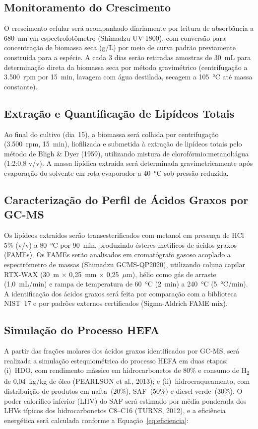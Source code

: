 \subsection{Monitoramento do Crescimento}

O crescimento celular será acompanhado diariamente por leitura de
absorbância a 680~nm em espectrofotômetro (Shimadzu UV-1800), com
conversão para concentração de biomassa seca (g/L) por meio de curva
padrão previamente construída para a espécie. A cada 3 dias serão
retiradas amostras de 30~mL para determinação direta da biomassa seca
por método gravimétrico (centrifugação a 3.500~rpm por 15~min, lavagem
com água destilada, secagem a 105~°C até massa constante).

\subsection{Extração e Quantificação de Lipídeos Totais}

Ao final do cultivo (dia~15), a biomassa será colhida por centrifugação
(3.500~rpm, 15~min), liofilizada e submetida à extração de lipídeos
totais pelo método de Bligh \& Dyer (1959), utilizando mistura de
clorofórmio:metanol:água (1:2:0,8 v/v). A massa lipídica extraída será
determinada gravimetricamente após evaporação do solvente em rota-evaporador
a 40~°C sob pressão reduzida.

\subsection{Caracterização do Perfil de Ácidos Graxos por GC-MS}

Os lipídeos extraídos serão transesterificados com metanol em presença de
HCl 5\% (v/v) a 80~°C por 90~min, produzindo ésteres metílicos de ácidos
graxos (FAMEs). Os FAMEs serão analisados em cromatógrafo gasoso acoplado
a espectrômetro de massas (Shimadzu GCMS-QP2020), utilizando coluna
capilar RTX-WAX (30~m $\times$ 0,25~mm $\times$ 0,25~$\mu$m), hélio como
gás de arraste (1,0~mL/min) e rampa de temperatura de 60~°C (2~min) a
240~°C (5~°C/min). A identificação dos ácidos graxos será feita por
comparação com a biblioteca NIST~17 e por padrões externos certificados
(Sigma-Aldrich FAME mix).

\subsection{Simulação do Processo HEFA}

A partir das frações molares dos ácidos graxos identificados por GC-MS,
será realizada a simulação estequiométrica do processo HEFA em duas etapas:
(i)~HDO, com rendimento mássico em hidrocarbonetos de 80\% e consumo de
H\textsubscript{2} de 0,04~kg/kg de óleo (PEARLSON et al., 2013); e
(ii)~hidrocraqueamento, com distribuição de produtos em nafta~(20\%),
SAF~(50\%) e diesel verde~(30\%). O poder calorífico inferior (LHV) do SAF
será estimado por média ponderada dos LHVs típicos dos hidrocarbonetos
C8--C16 (TURNS, 2012), e a eficiência energética será calculada conforme a
Equação~\ref{eq:eficiencia}:

